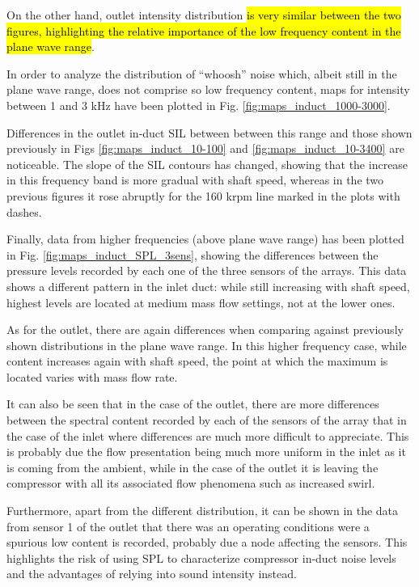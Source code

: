 On the other hand, outlet intensity distribution \hl{is very similar between the two figures, highlighting the relative importance of the low frequency content in the plane wave range}.

In order to analyze the distribution of ``whoosh'' noise which, albeit still in the plane wave range, does not comprise so low frequency content, maps for intensity between 1 and 3 kHz have been plotted in Fig. \ref{fig:maps_induct_1000-3000}.

Differences in the outlet in-duct SIL between between this range and those shown previously in Figs \ref{fig:maps_induct_10-100} and \ref{fig:maps_induct_10-3400} are noticeable. The slope of the SIL contours has changed, showing that the increase in this frequency band is more gradual with shaft speed, whereas in the two previous figures it rose abruptly for the 160 krpm line marked in the plots with dashes.

Finally, data from higher frequencies (above plane wave range) has been plotted in Fig. \ref{fig:maps_induct_SPL_3sens}, showing the differences between the pressure levels recorded by each one of the three sensors of the arrays. This data shows a different pattern in the inlet duct: while still increasing with shaft speed, highest levels are located at medium mass flow settings, not at the lower ones.

As for the outlet, there are again differences when comparing against previously shown distributions in the plane wave range. In this higher frequency case, while content increases again with shaft speed, the point at which the maximum is located varies with mass flow rate.

It can also be seen that in the case of the outlet, there are more differences between the spectral content recorded by each of the sensors of the array that in the case of the inlet where differences are much more difficult to appreciate. This is probably due the flow presentation being much more uniform in the inlet as it is coming from the ambient, while in the case of the outlet it is leaving the compressor with all its associated flow phenomena such as increased swirl.

Furthermore, apart from the different distribution, it can be shown in the data from sensor 1 of the outlet that there was an operating conditions were a spurious low content is recorded, probably due a node affecting the sensors. This highlights the risk of using SPL to characterize compressor in-duct noise levels and the advantages of relying into sound intensity instead.

